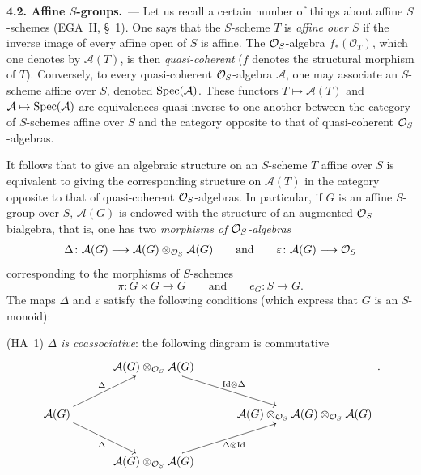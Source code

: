 \par{}
\noindent\textbf{4.2. Affine \(S\)-groups.}\label{I.4.2}\ ---
Let us recall a certain number of things about affine \(S\)-schemes
(EGA~II, \S~1). One says that the \(S\)-scheme \(T\) is \emph{affine over
\(S\)} if the inverse image of every affine open of \(S\) is affine. The
\(\mathcal{O}_S\)-algebra \(f_*(\mathcal{O}_T)\), which one denotes by \(\mathcal{A}(T)\),
is then \emph{quasi-coherent} (\(f\) denotes the structural morphism of
\(T\)). Conversely, to every quasi-coherent \(\mathcal{O}_S\)-algebra \(\mathcal{A}\),
one may associate an \(S\)-scheme affine over \(S\), denoted
\(\operatorname{Spec}(\mathcal{A})\). These functors \(T\mapsto\mathcal{A}(T)\) and
\(\mathcal{A}\mapsto\operatorname{Spec}(\mathcal{A})\) are equivalences quasi-inverse to
one another between the category of \(S\)-schemes affine over \(S\) and the
category opposite to that of quasi-coherent \(\mathcal{O}_S\)-algebras.

It follows that to give an algebraic structure on an \(S\)-scheme \(T\)
affine over \(S\) is equivalent to giving the corresponding structure on
\(\mathcal{A}(T)\) in the category opposite to that of quasi-coherent
\(\mathcal{O}_S\)-algebras. In particular, if \(G\) is an affine \(S\)-group over \(S\),
\(\mathcal{A}(G)\) is endowed with the structure of an augmented
\(\mathcal{O}_S\)-bialgebra, that is, one has two \emph{morphisms of
\(\mathcal{O}_S\)-algebras}
\begin{gather*}
\Delta\colon\mathcal{A}(G)\longrightarrow
  \mathcal{A}(G)\otimes_{\mathcal{O}_S}\mathcal{A}(G)
\qquad\text{and}\qquad
\varepsilon\colon\mathcal{A}(G)\longrightarrow\mathcal{O}_S
\end{gather*}
corresponding to the morphisms of \(S\)-schemes
\[
\pi\colon G\times G\longrightarrow G
\qquad\text{and}\qquad
e_G\colon S\longrightarrow G.
\]
The maps \(\Delta\) and \(\varepsilon\) satisfy the following conditions
(which express that \(G\) is an \(S\)-monoid):

(HA~1) \(\Delta\) \emph{is coassociative}: the following diagram is commutative
\[
\xymatrix@C=3.2em@R=2.6em{
& \mathcal{A}(G)\otimes_{\OS}\mathcal{A}(G)
    \ar[dr]^{\mathrm{Id}\otimes\Delta} & \\
\mathcal{A}(G) \ar[ur]^{\Delta} \ar[dr]_{\Delta}
&& \mathcal{A}(G)\otimes_{\OS}\mathcal{A}(G)\otimes_{\OS}\mathcal{A}(G) \\
& \mathcal{A}(G)\otimes_{\OS}\mathcal{A}(G)
    \ar[ur]_{\Delta\otimes\mathrm{Id}} &
}\,.
\]

